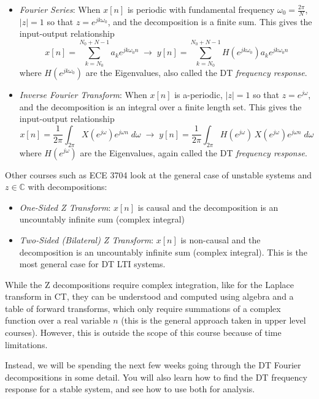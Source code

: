   \begin{itemize}
  \item \emph{Fourier Series}: When $x[n]$ is periodic with fundamental frequency $\omega_0 = \frac{2\pi}{N}$, $|z| = 1$ so that $z = e^{jk\omega_0}$, and the decomposition is a finite sum. This gives the input-output relationship
    \[
 x[n] = \sum\limits_{k = N_0}^{N_0 + N-1} a_k e^{jk\omega_0n} \;\longrightarrow\;  y[n] = \sum\limits_{k = N_0}^{N_0 + N-1} H\left(e^{j k\omega_0}\right) a_k e^{jk\omega_0 n} 
    \]
    where $H\left(e^{j k\omega_0}\right)$ are the Eigenvalues, also called the DT \emph{frequency response}.
  \item \emph{Inverse Fourier Transform}: When $x[n]$ is a-periodic, $|z| = 1$ so that $z = e^{j\omega}$, and the decomposition is an integral over a finite length set. This gives the input-output relationship
    \[
     x[n] = \frac{1}{2\pi} \int_{2\pi} X\left(e^{j\omega}\right) e^{j\omega n} \; d\omega \;\longrightarrow\;   y[n] = \frac{1}{2\pi} \int_{2\pi} H\left(e^{j\omega}\right) \, X\left(e^{j\omega}\right) e^{j\omega n} \; d\omega
    \]
    where $H\left(e^{j \omega}\right)$ are the Eigenvalues, again called the DT \emph{frequency response}.  
  \end{itemize}

  Other courses such as ECE 3704 look at the general case of unstable systems and $z \in \mathbb{C}$ with decompositions:

  \begin{itemize}
  \item \emph{One-Sided Z Transform}: $x[n]$ is causal and the decomposition is an uncountably infinite sum (complex integral)
  \item \emph{Two-Sided (Bilateral) Z Transform}: $x[n]$ is non-causal and the decomposition is an uncountably infinite sum (complex integral). This is the most general case for DT LTI systems.
  \end{itemize}

  While the Z decompositions require complex integration, like for the Laplace transform in CT, they can be understood and computed using algebra and a table of forward transforms, which only require summations of a complex function over a real variable $n$ (this is the general approach taken in upper level courses). However, this is outside the scope of this course because of time limitations.

Instead, we will be spending the next few weeks going through the DT Fourier decompositions in some detail. You will also learn how to find the DT frequency response for a stable system, and see how to use both for analysis.

